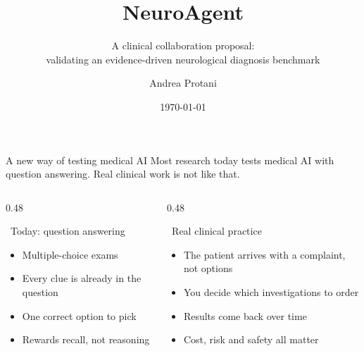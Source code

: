 \documentclass[aspectratio=169,t]{beamer}
\title{NeuroAgent}
\subtitle{A clinical collaboration proposal:\\
          validating an evidence-driven neurological diagnosis benchmark}
\author{Andrea Protani}
\date{\today}
\begin{document}
\maketitle

\begin{frame}{A new way of testing medical AI}
  \centering\footnotesize\color{CERNtextdark}
  Most research today tests medical AI with \alert{question answering}.
  Real clinical work is not like that.

  \vspace{2mm}
  \begin{columns}[T,onlytextwidth]
    \begin{column}{0.48\textwidth}
      \begin{block}{{\color{CERNblue}\faListOl}\;\, Today: question answering}
        \footnotesize
        \begin{itemize}\setlength\itemsep{0.3em}
          \item Multiple-choice exams
          \item Every clue is already in the question
          \item One correct option to pick
          \item Rewards recall, not reasoning
        \end{itemize}
      \end{block}
    \end{column}%
    \hfill
    \begin{column}{0.48\textwidth}
      \begin{alertblock}{{\color{CERNorange}\faUserInjured}\;\, Real clinical practice}
        \footnotesize
        \begin{itemize}\setlength\itemsep{0.3em}
          \item The patient arrives with a complaint, not options
          \item You decide which investigations to order
          \item Results come back over time
          \item Cost, risk and safety all matter
        \end{itemize}
      \end{alertblock}
    \end{column}
  \end{columns}


\end{frame}
\end{document}
